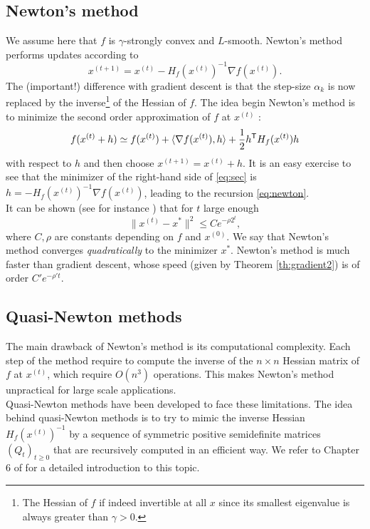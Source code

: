 \documentclass[11pt,nocut]{article}
\begin{document}
\subsection{Newton's method}
We assume here that $f$ is $\gamma$-strongly convex and $L$-smooth.
Newton's method performs updates according to
\begin{equation}\label{eq:newton}
	x^{(t+1)} = x^{(t)} - H_f(x^{(t)})^{-1} \nabla f(x^{(t)}).
\end{equation}
The (important!) difference with gradient descent is that the step-size $\alpha_k$ is now replaced by the inverse\footnote{The Hessian of $f$ if indeed invertible at all $x$ since its smallest eigenvalue is always greater than $\gamma >0$.} of the Hessian of $f$. The idea begin Newton's method is to minimize the second order approximation of $f$ at $x^{(t)}$ :
\begin{equation}\label{eq:sec}
	f(x^{(t)}+h) \simeq f(x^{(t)}) + \langle \nabla f(x^{(t)}), h \rangle + \frac{1}{2} h^{{\sf T}} H_f(x^{(t)}) h
\end{equation}
with respect to $h$ and then choose $x^{(t+1)} = x^{(t)} + h$. It is an easy exercise to see that the minimizer of the right-hand side of \eqref{eq:sec} is $h=- H_f(x^{(t)})^{-1} \nabla f(x^{(t)})$, leading to the recursion \eqref{eq:newton}.
\\

It can be shown (see for instance \cite{boyd2004convex}) that for $t$ large enough
\begin{equation}\label{eq:newton}
\|x^{(t)} - x^* \|^2 \leq C e^{-\rho 2^t},
\end{equation}
where $C,\rho$ are constants depending on $f$ and $x^{(0)}$. We say that Newton's method converges \emph{quadratically} to the minimizer $x^*$. Newton's method is much faster than gradient descent, whose speed (given by Theorem \ref{th:gradient2}) is of order $C' e^{-\rho' t}$.


\subsection{Quasi-Newton methods}

The main drawback of Newton's method is its computational complexity. Each step of the method require to compute the inverse of the $n \times n$ Hessian matrix of $f$ at $x^{(t)}$, which require $O(n^3)$ operations. This makes Newton's method unpractical for large scale applications.
\\

Quasi-Newton methods have been developed to face these limitations. 
The idea behind quasi-Newton methods is to try to mimic the inverse Hessian $H_f(x^{(t)})^{-1}$ by a sequence of symmetric positive semidefinite matrices $(Q_t)_{t \geq 0}$ that are recursively computed in an efficient way. We refer to Chapter 6 of \cite{nocedal2006numerical} for a detailed introduction to this topic.
\end{document}
